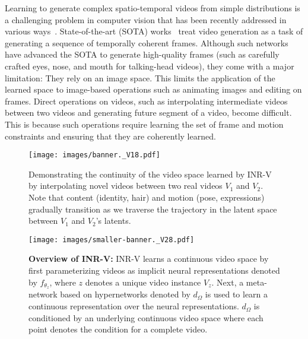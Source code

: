 \documentclass[10pt]{article} \usepackage[accepted]{tmlr}
\begin{document}
Learning to generate complex spatio-temporal videos from simple distributions is a challenging problem in computer vision that has been recently addressed in various ways~\cite{mocogan-hd, mocogan, dvd-gan, stylegan-v, tgan, digan, videogpt}. State-of-the-art (SOTA) works~\cite{stylegan-v, mocogan-hd, digan} treat video generation as a task of generating a sequence of temporally coherent frames. Although such networks have advanced the SOTA to generate high-quality frames (such as carefully crafted eyes, nose, and mouth for talking-head videos), they come with a major limitation: They rely on an image space. This limits the application of the learned space to image-based operations such as animating images and editing on frames. Direct operations on videos, such as interpolating intermediate videos between two videos and generating future segment of a video, become difficult. 
This is because such operations require learning the set of frame and motion constraints and ensuring that they are coherently learned.

\begin{figure}
  \centering
  \texttt{[image: images/banner.\_V18.pdf]}
    \caption{Demonstrating the continuity of the video space learned by INR-V by interpolating novel videos between two real videos $V_1$ and $V_2$. Note that content (identity, hair) and motion (pose, expressions) gradually transition as we traverse the trajectory in the latent space between $V_1$ and $V_2$'s latents.}
  \label{fig:banner-interpolation}
\end{figure}

\begin{wrapfigure}[23]{R}{0.4\textwidth}
\centering
\vspace{-21pt}
\texttt{[image: images/smaller-banner.\_V28.pdf]}
\caption{\textbf{Overview of INR-V:}  INR-V learns a continuous video space by first parameterizing videos as implicit neural representations denoted by $f_{\theta_z}$, where $z$ denotes a unique video instance $V_z$. Next, a meta-network based on hypernetworks denoted by $d_\Omega$ is used to learn a continuous representation over the neural representations. $d_\Omega$ is conditioned by an underlying continuous video space where each point denotes the condition for a complete video.}
\label{fig:arch-teaser}
\end{wrapfigure}
\end{document}
